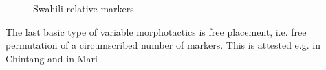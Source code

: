 \documentclass[output=paper
	        ,collection
	        ,collectionchapter
 	        ,biblatex
                ,babelshorthands
                ,newtxmath
                ,draftmode
                ,colorlinks, citecolor=brown
]{langscibook}
\begin{document}
\begin{exe}
\begin{xlist}
\begin{exe}
\begin{xlist}
\begin{figure}[htb]
  \centering
  
\caption{Swahili relative markers}\label{fig:SwahiliRel}
\end{figure}


The last basic type of variable morphotactics is free placement,
i.e. free permutation of a circumscribed number of
markers. This is attested e.g. in Chintang \citep{Bickel07} and in
Mari \citep{Luutonen97}.



\end{xlist}
\end{exe}
\end{xlist}
\end{exe}
\end{document}
